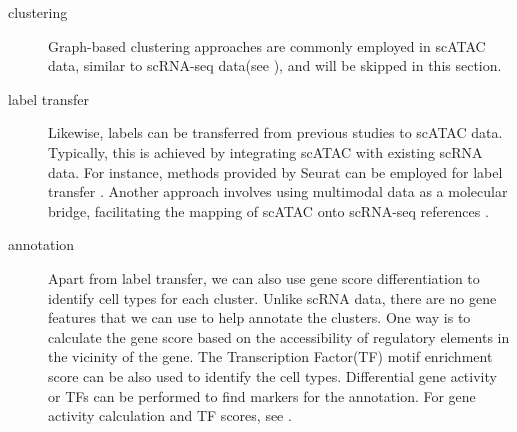 \begin{description}
	 \item[clustering]
	Graph-based clustering approaches are commonly employed in scATAC data, similar to scRNA-seq data(see ), and will be skipped in this section.	
	
	 \item[label transfer]
	Likewise, labels can be transferred from previous studies to scATAC data. Typically, this is achieved by integrating scATAC with existing scRNA data. For instance, methods provided by Seurat can be employed for label transfer \citep{stuart2019seurat3}. Another approach involves using multimodal data as a molecular bridge, facilitating the mapping of scATAC onto scRNA-seq references \citep{hao2023dictionary}.
	
	 \item[annotation] 
	Apart from label transfer, we can also use gene score differentiation to identify cell types for each cluster. Unlike scRNA data, there are no gene features that we can use to help annotate the clusters. One way is to calculate the gene score based on the accessibility of regulatory elements in the vicinity of the gene. The Transcription Factor(TF) motif enrichment score can be also used to identify the cell types. Differential gene activity or TFs can be performed to find markers for the annotation. For gene activity calculation and TF scores, see . 
\end{description}
